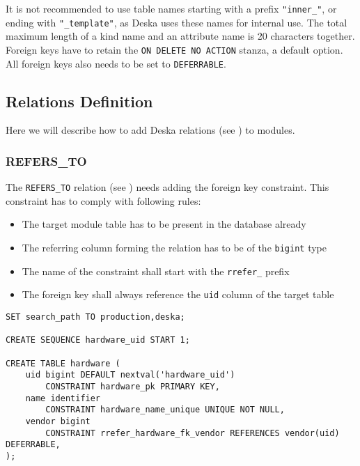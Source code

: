 \documentclass[deska]{subfiles}
\begin{document}
It is not recommended to use table names starting with a prefix {\tt "inner\_"}, or ending with {\tt "\_template"}, as
Deska uses these names for internal use.  The total maximum length of a kind name and an attribute name is 20 characters
together.  Foreign keys have to retain the {\tt ON DELETE NO ACTION} stanza, a default option. All foreign keys also
needs to be set to {\tt DEFERRABLE}.

\subsection{Relations Definition}
Here we will describe how to add Deska relations (see ) to modules.


\subsubsection{REFERS\_TO}
\label{sec:db-scheme-refers-to}

The {\tt REFERS\_TO} relation (see ) needs adding the foreign key constraint. This constraint has to comply with following rules:

\begin{itemize}
    \item The target module table has to be present in the database already
    \item The referring column forming the relation has to be of the {\tt bigint} type
    \item The name of the constraint shall start with the {\tt rrefer\_} prefix
    \item The foreign key shall always reference the {\tt uid} column of the target table
\end{itemize}

\begin{verbatim}
SET search_path TO production,deska;

CREATE SEQUENCE hardware_uid START 1;

CREATE TABLE hardware (
    uid bigint DEFAULT nextval('hardware_uid')
        CONSTRAINT hardware_pk PRIMARY KEY,
    name identifier
        CONSTRAINT hardware_name_unique UNIQUE NOT NULL,
    vendor bigint 
        CONSTRAINT rrefer_hardware_fk_vendor REFERENCES vendor(uid) DEFERRABLE,
);
\end{verbatim}
\end{document}
